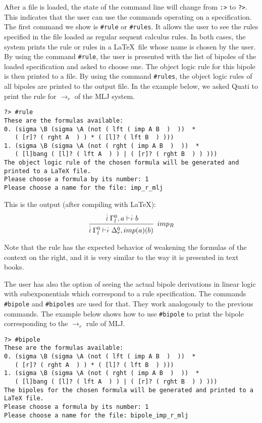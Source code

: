 \documentclass{llncs}
\newcommand{\ndots}[1]{\stackrel{\vcenter{\hbox{$\scriptstyle :$}\vskip-.35ex}}
   {\hbox {$ \scriptstyle {#1}$}}}
\begin{document}
After a file is loaded, the state of the command line will change from
\texttt{:>} to \texttt{?>}. This indicates that the user can use the commands
operating on a specification. The first command we show is \texttt{\#rule} or
\texttt{\#rules}. It allows the user to see the rules specified in the file
loaded as regular sequent calculus rules. In both cases, the system prints the
rule or rules in a \LaTeX\ file whose name is chosen by the user. By using the
command \texttt{\#rule}, the user is presented with the list of bipoles of the
loaded specification and asked to choose one. The object logic rule for this
bipole is then printed to a file. By using the command \texttt{\#rules}, the
object logic rules of all bipoles are printed to the output file. In the example
below, we asked Quati to print the rule for $\rightarrow_r$ of the MLJ system.
%
{\scriptsize
\begin{verbatim}
?> #rule
These are the formulas available: 
0. (sigma \B (sigma \A (not ( lft ( imp A B  )  ))  * 
   ( [r]? ( rght A  ) ) * ( [l]? ( lft B  ) )))
1. (sigma \B (sigma \A (not ( rght ( imp A B  )  ))  * 
   ( [l]bang ( [l]? ( lft A  ) ) | ( [r]? ( rght B  ) ) )))
The object logic rule of the chosen formula will be generated and printed to a LaTeX file.
Please choose a formula by its number: 1
Please choose a name for the file: imp_r_mlj
\end{verbatim}
}

This is the output (after compiling with \LaTeX):
%
{\scriptsize
\[
\cfrac{ \ndots{l} \Gamma_{l}^{0}, a \vdash  \ndots{r} b}
{ \ndots{l} \Gamma_{l}^{0} \vdash  \ndots{r} \Delta_{r}^{0}, imp (a) (b) } \;\; imp_{R}
\]
}

Note that the rule has the expected behavior of weakening the formulas of the
context on the right, and it is very similar to the way it is presented in text
books.

The user has also the option of seeing the actual bipole derivations in linear
logic with subexponentials which correspond to a rule specification. The
commands \texttt{\#bipole} and \texttt{\#bipoles} are used for that. They work
analogously to the previous commands. The example below shows how to use
\texttt{\#bipole} to print the bipole corresponding to the $\rightarrow_r$ rule
of MLJ.
%
{\scriptsize
\begin{verbatim}
?> #bipole 
These are the formulas available: 
0. (sigma \B (sigma \A (not ( lft ( imp A B  )  ))  * 
   ( [r]? ( rght A  ) ) * ( [l]? ( lft B  ) )))
1. (sigma \B (sigma \A (not ( rght ( imp A B  )  ))  * 
   ( [l]bang ( [l]? ( lft A  ) ) | ( [r]? ( rght B  ) ) )))
The bipoles for the chosen formula will be generated and printed to a LaTeX file.
Please choose a formula by its number: 1
Please choose a name for the file: bipole_imp_r_mlj
\end{verbatim}
}
\end{document}
